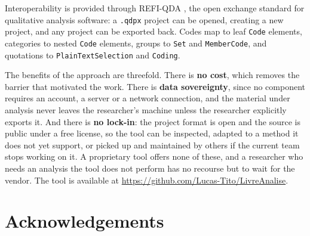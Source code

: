 \documentclass[12pt]{article}
\begin{document}
Interoperability is provided through REFI-QDA \cite{refiqda}, the open
exchange standard for qualitative analysis software: a
\texttt{.qdpx} project can be opened, creating a new project, and any project
can be exported back. Codes map to leaf \texttt{Code} elements,
categories to nested \texttt{Code} elements, groups to \texttt{Set} and
\texttt{MemberCode}, and quotations to \texttt{PlainTextSelection} and
\texttt{Coding}.

The benefits of the approach are threefold. There is \textbf{no cost}, which
removes the barrier that motivated the work. There is \textbf{data
sovereignty}, since no component requires an account, a server or a network
connection, and the material under analysis never leaves the researcher's
machine unless the researcher explicitly exports it. And there is \textbf{no
lock-in}: the project format is open and the source is public under a free
license, so the tool can be inspected, adapted to a method it does not yet
support, or picked up and maintained by others if the current team stops
working on it. A proprietary tool offers none of these, and a researcher who
needs an analysis the tool does not perform has no recourse but to wait for the
vendor. The tool is available at
\url{https://github.com/Lucas-Tito/LivreAnalise}.

\section*{Acknowledgements}

\end{document}
